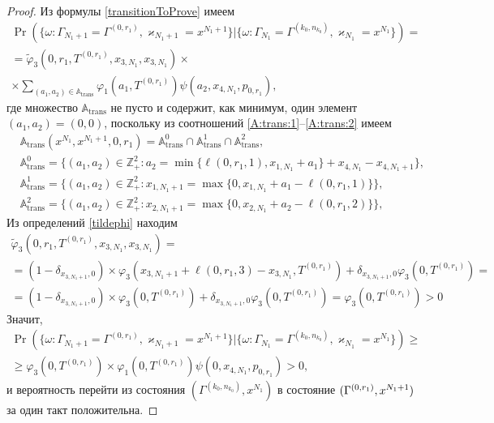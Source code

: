 \documentclass{report}
\begin{document}
\begin{proof}
Из формулы \eqref{transitionToProve} имеем
\begin{multline*}
\Pr (\{\omega\colon \Gamma_{N_1+1}=\Gamma^{(0,r_1)},\varkappa_{N_1+1}=x^{N_1+1} \}|\{\omega\colon  \Gamma_{N_1}=\Gamma^{(k_0,n_{k_0})},\varkappa_{N_1}=x^{N_1}\})=\\
=\widetilde{\varphi}_3(0,r_1,T^{(0,r_1)},x_{3,N_1},x_{3,N_1})\times \\
\times
\sum_{(a_1,a_2)\in {\mathbb A}_{\mathrm{trans}}}\varphi_1(a_1,T^{(0,r_1)})  \psi(a_2,x_{4,N_1}, p_{0,r_1}),
\end{multline*}
где множество ${\mathbb A}_{\mathrm{trans}}$ не пусто и содержит, как минимум, один элемент $(a_1,a_2)=(0,0)$, поскольку из соотношений \eqref{A:trans:1}--\eqref{A:trans:2} имеем
\begin{align*}
&{\mathbb A}_{\mathrm{trans}}(x^{N_1},x^{N_1+1},0,r_1) = {\mathbb A}_{\mathrm{trans}}^0 \cap {\mathbb A}_{\mathrm{trans}}^1\cap {\mathbb A}_{\mathrm{trans}}^2,\\
&{\mathbb A}_{\mathrm{trans}}^0 = \{(a_1,a_2) \in \mathbb{Z}_+^2 \colon a_2 = \min{\{\ell(0,r_1,1), x_{1,N_1}+a_1}\} +x_{4,N_1}-x_{4,N_1+1} \}, \\
&{\mathbb A}_{\mathrm{trans}}^1 = \{(a_1,a_2) \in \mathbb{Z}_+^2 \colon x_{1,N_1+1} =\max{\{0,x_{1,N_1}+a_1-\ell(0,r_1,1)\}}\},\\
& {\mathbb A}_{\mathrm{trans}}^2 = \{(a_1,a_2) \in \mathbb{Z}_+^2 \colon  x_{2,N_1+1}=\max{\{0,x_{2,N_1}+a_2-\ell(0,r_1,2)\}}\},
\end{align*}
Из определений \eqref{tildephi} находим
\begin{multline*}
\widetilde{\varphi}_3(0,r_1,T^{(0,r_1)},x_{3,N_1},x_{3,N_1})=\\=(1-\delta_{x_{3,N_1+1},0}) \times\varphi_3(x_{3,N_1+1} + \ell (0,r_1,3) - x_{3,N_1},T^{(0,r_1)} )
+\delta_{x_{3,N_1+1},0} \varphi_3 (0,T^{(0,r_1)}) = \\=
(1-\delta_{x_{3,N_1+1},0}) \times\varphi_3(0,T^{(0,r_1)} )
+\delta_{x_{3,N_1+1},0} \varphi_3 (0,T^{(0,r_1)}) = \varphi_3 (0,T^{(0,r_1)})> 0
\end{multline*}
Значит,
\begin{multline*}
\Pr (\{\omega\colon \Gamma_{N_1+1}=\Gamma^{(0,r_1)},\varkappa_{N_1+1}=x^{N_1+1} \}|\{\omega\colon  \Gamma_{N_1}=\Gamma^{(k_0,n_{k_0})},\varkappa_{N_1}=x^{N_1}\})\geqslant\\
\geqslant\varphi_3 (0,T^{(0,r_1)})
\times
\varphi_1(0,T^{(0,r_1)})  \psi(0,x_{4,N_1}, p_{0,r_1}) > 0,
\end{multline*}
и вероятность перейти из состояния $(\Gamma^{(k_0,n_{k_0})}, x^{N_1})$ в состояние $ (\Gamma^{(0,r_1)}, \hm{} x^{N_1+1})$ за один такт положительна.


\end{proof}
\end{document}
